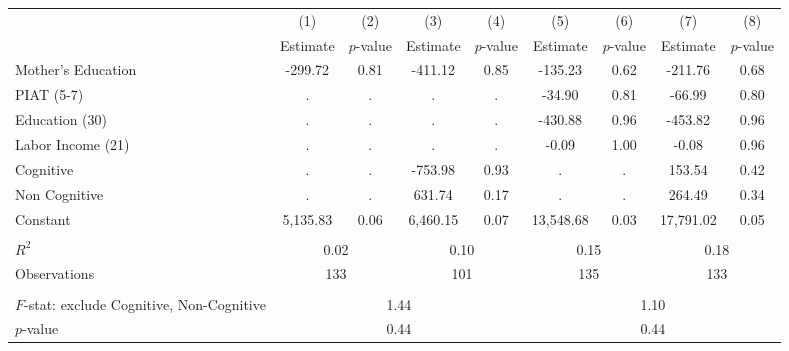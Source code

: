\begin{tabular}{lcccccccc} \toprule
 & (1) & (2) & (3) & (4) & (5) & (6) & (7) & (8) \\
 & Estimate & $p$-value & Estimate & $p$-value  & Estimate & $p$-value  & Estimate & $p$-value  \\ \midrule 
Mother's Education &      -299.72 &         0.81 &      -411.12 &         0.85 &      -135.23 &         0.62 &      -211.76 &         0.68 \\  
PIAT (5-7) &            . &            . &            . &            . &       -34.90 &         0.81 &       -66.99 &         0.80 \\  
Education (30) &            . &            . &            . &            . &      -430.88 &         0.96 &      -453.82 &         0.96 \\  
Labor Income (21) &            . &            . &            . &            . &        -0.09 &         1.00 &        -0.08 &         0.96 \\  
Cognitive &            . &            . &      -753.98 &         0.93 &            . &            . &       153.54 &         0.42 \\  
Non Cognitive &            . &            . &       631.74 &         0.17 &            . &            . &       264.49 &         0.34 \\  
Constant &     5,135.83 &         0.06 &     6,460.15 &         0.07 &    13,548.68 &         0.03 &    17,791.02 &         0.05 \\   \\ \midrule
$R^2$ &         \multicolumn{2}{c}{0.02} &         \multicolumn{2}{c}{0.10} &               \multicolumn{2}{c}{0.15} &            \multicolumn{2}{c}{0.18}  \\  
Observations &       \multicolumn{2}{c}{133} &           \multicolumn{2}{c}{101} &         \multicolumn{2}{c}{135} &            \multicolumn{2}{c}{133}  \\  \\ \midrule
$F$-stat: exclude Cognitive, Non-Cognitive &              \multicolumn{4}{c}{1.44} &             \multicolumn{4}{c}{1.10}  \\  
$p$-value &            \multicolumn{4}{c}{0.44} &               \multicolumn{4}{c}{0.44}  \\   \bottomrule \end{tabular}

